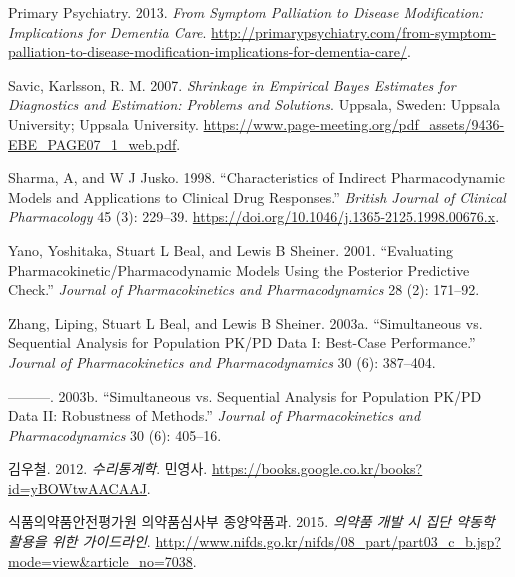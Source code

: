 \documentclass[
  11pt,
  krantz2, a4paper, twoside]{krantz}
\newlength{\cslhangindent}
\newenvironment{cslreferences}%
  {\setlength{\parindent}{0pt}%
  \everypar{\setlength{\hangindent}{\cslhangindent}}\ignorespaces}%
  {\par}
\theoremstyle{definition}
\theoremstyle{definition}
\theoremstyle{definition}
\theoremstyle{remark}
\begin{document}
\begin{cslreferences}
\leavevmode\hypertarget{ref-dementia}{}%
Primary Psychiatry. 2013. \emph{From Symptom Palliation to Disease Modification: Implications for Dementia Care}. \url{http://primarypsychiatry.com/from-symptom-palliation-to-disease-modification-implications-for-dementia-care/}.

\leavevmode\hypertarget{ref-uppsala}{}%
Savic, Karlsson, R. M. 2007. \emph{Shrinkage in Empirical Bayes Estimates for Diagnostics and Estimation: Problems and Solutions}. Uppsala, Sweden: Uppsala University; Uppsala University. \url{https://www.page-meeting.org/pdf_assets/9436-EBE_PAGE07_1_web.pdf}.

\leavevmode\hypertarget{ref-sharma1998characteristics}{}%
Sharma, A, and W J Jusko. 1998. ``Characteristics of Indirect Pharmacodynamic Models and Applications to Clinical Drug Responses.'' \emph{British Journal of Clinical Pharmacology} 45 (3): 229--39. \url{https://doi.org/10.1046/j.1365-2125.1998.00676.x}.

\leavevmode\hypertarget{ref-yano2001evaluating}{}%
Yano, Yoshitaka, Stuart L Beal, and Lewis B Sheiner. 2001. ``Evaluating Pharmacokinetic/Pharmacodynamic Models Using the Posterior Predictive Check.'' \emph{Journal of Pharmacokinetics and Pharmacodynamics} 28 (2): 171--92.

\leavevmode\hypertarget{ref-zhang1}{}%
Zhang, Liping, Stuart L Beal, and Lewis B Sheiner. 2003a. ``Simultaneous vs. Sequential Analysis for Population PK/PD Data I: Best-Case Performance.'' \emph{Journal of Pharmacokinetics and Pharmacodynamics} 30 (6): 387--404.

\leavevmode\hypertarget{ref-zhang2}{}%
---------. 2003b. ``Simultaneous vs. Sequential Analysis for Population PK/PD Data II: Robustness of Methods.'' \emph{Journal of Pharmacokinetics and Pharmacodynamics} 30 (6): 405--16.

\leavevmode\hypertarget{ref-kim}{}%
김우철. 2012. \emph{수리통계학}. 민영사. \url{https://books.google.co.kr/books?id=yBOWtwAACAAJ}.

\leavevmode\hypertarget{ref-poppk}{}%
식품의약품안전평가원 의약품심사부 종양약품과. 2015. \emph{의약품 개발 시 집단 약동학 활용을 위한 가이드라인}. \url{http://www.nifds.go.kr/nifds/08_part/part03_c_b.jsp?mode=view\&article_no=7038}.
\end{cslreferences}

\printindex
\end{document}
